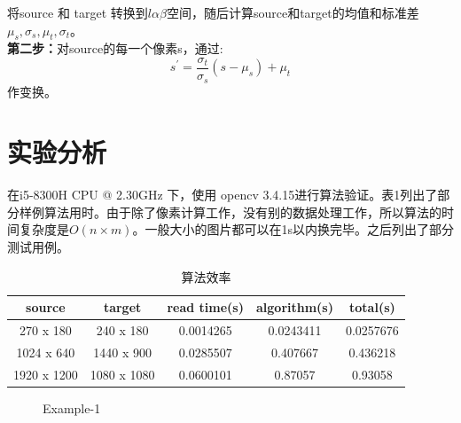 \documentclass[12pt]{article}
\begin{document}
	将source 和 target 转换到$ l\alpha\beta $空间，随后计算source和target的均值和标准差$ \mu_s, \sigma_s, \mu_t, \sigma_t $。\\ 
	
	\textbf{第二步：}对source的每一个像素s，通过:
	\begin{equation*}
		s^{\prime} = \frac{\sigma_t}{\sigma_s} (s - \mu_s) + \mu_t
	\end{equation*}
    作变换。

	\section{实验分析}
	在i5-8300H CPU @ 2.30GHz 下，使用 opencv 3.4.15进行算法验证。表1列出了部分样例算法用时。由于除了像素计算工作，没有别的数据处理工作，所以算法的时间复杂度是$ O(n\times m)$。一般大小的图片都可以在1s以内换完毕。之后列出了部分测试用例。
	
	\begin{table}[H]
		\centering
		\caption{算法效率}
		\begin{tabular}{|c|c|c|c|c|}
			\hline
			source      & target      & read time(s) & algorithm(s) & total(s)  \\ \hline
			270 x 180   & 240 x 180   & 0.0014265    & 0.0243411    & 0.0257676 \\ \hline
			1024 x 640  & 1440 x 900  & 0.0285507    & 0.407667     & 0.436218  \\ \hline
			1920 x 1200 & 1080 x 1080 & 0.0600101    & 0.87057      & 0.93058   \\ \hline
		\end{tabular}
	\end{table}
	
	\begin{figure}[htbp]
		\centering
		\centering
		\caption{Example-1}
	\end{figure}
\end{document}
